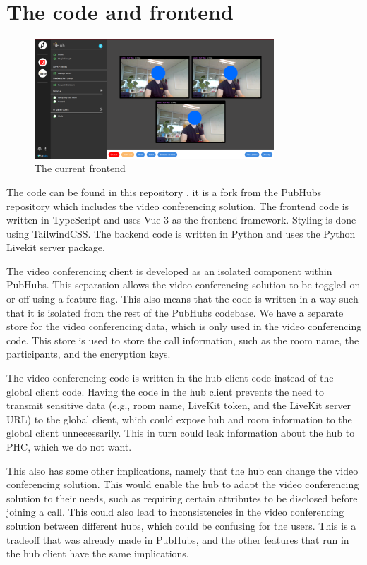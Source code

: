 \documentclass{report}
\begin{document}
\section{The code and frontend}
\begin{figure}[!hbt]
\centering
\includegraphics[width=0.8\textwidth]{img/frontend.png}
\caption{The current frontend}
\label{fig:front-end-setup}
\end{figure}
The code can be found in this repository \cite{horst_gulianrdgdmaster-scriptie-pubhubs_2024}, it is a fork from the PubHubs
repository which includes the video conferencing solution. The frontend code is written in TypeScript and uses Vue 3
as the frontend framework. Styling is done using TailwindCSS. The backend code is written in Python and uses the
Python Livekit server package.

The video conferencing client is developed as an isolated component within PubHubs. This separation allows the
video conferencing solution to be toggled on or off using a feature flag.
This also means that the code is written in a way such that it is isolated from the rest of the PubHubs codebase.
We have a separate store for the video conferencing data, which is only used in the video conferencing code.
This store is used to store the call information, such as the room name, the participants, and the encryption keys.

The video conferencing code is written in the hub client code instead of the global client code. Having the code in
the hub client prevents the need to transmit sensitive data (e.g., room name, LiveKit token, and the LiveKit
server URL) to the global client, which could expose hub and room information to the global client unnecessarily.
This in turn could leak information about the hub to PHC, which we do not want.

This also has some other implications, namely that the hub can change the video conferencing solution.
This would enable the hub to adapt the video conferencing solution to their needs, such as requiring certain
attributes to be disclosed before joining a call. This could also lead to inconsistencies in the video conferencing
solution between different hubs, which could be confusing for the users. This is a tradeoff that was already made in
PubHubs, and the other features that run in the hub client have the same implications.
\end{document}
